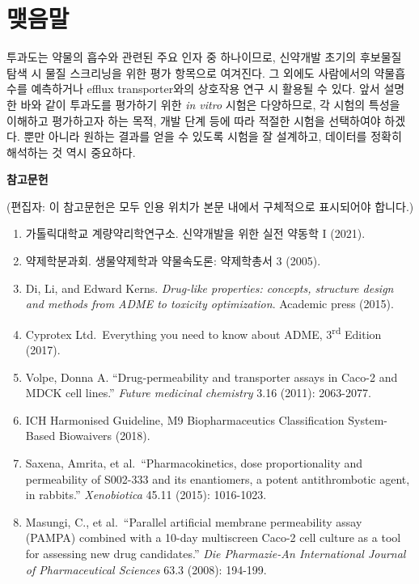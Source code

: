 \documentclass[
  11pt,
  krantz2, a4paper, twoside]{krantz}
\providecommand{\tightlist}{%
  \setlength{\itemsep}{0pt}\setlength{\parskip}{0pt}}
\begin{document}
\hypertarget{uxb9fauxc74cuxb9d0-1}{%
\section{맺음말}\label{uxb9fauxc74cuxb9d0-1}}

투과도는 약물의 흡수와 관련된 주요 인자 중 하나이므로, 신약개발 초기의
후보물질 탐색 시 물질 스크리닝을 위한 평가 항목으로 여겨진다. 그 외에도
사람에서의 약물흡수를 예측하거나 efflux transporter와의 상호작용 연구 시
활용될 수 있다. 앞서 설명한 바와 같이 투과도를 평가하기 위한 \emph{in vitro}
시험은 다양하므로, 각 시험의 특성을 이해하고 평가하고자 하는 목적, 개발
단계 등에 따라 적절한 시험을 선택하여야 하겠다. 뿐만 아니라 원하는
결과를 얻을 수 있도록 시험을 잘 설계하고, 데이터를 정확히 해석하는 것
역시 중요하다.

\textbf{참고문헌}

(편집자: 이 참고문헌은 모두 인용 위치가 본문 내에서 구체적으로
표시되어야 합니다.)

\begin{enumerate}
\def\labelenumi{\arabic{enumi}.}
\tightlist
\item
  가톨릭대학교 계량약리학연구소. 신약개발을 위한 실전 약동학 I (2021).
\item
  약제학분과회. 생물약제학과 약물속도론: 약제학총서 3 (2005).
\item
  Di, Li, and Edward Kerns. \emph{Drug-like properties: concepts, structure
  design and methods from ADME to toxicity optimization}. Academic
  press (2015).
\item
  Cyprotex Ltd.~Everything you need to know about ADME, 3\textsuperscript{rd} Edition
  (2017).
\item
  Volpe, Donna A. ``Drug-permeability and transporter assays in Caco-2
  and MDCK cell lines.'' \emph{Future medicinal chemistry} 3.16 (2011):
  2063-2077.
\item
  ICH Harmonised Guideline, M9 Biopharmaceutics Classification
  System-Based Biowaivers (2018).
\item
  Saxena, Amrita, et al.~``Pharmacokinetics, dose proportionality and
  permeability of S002-333 and its enantiomers, a potent
  antithrombotic agent, in rabbits.'' \emph{Xenobiotica} 45.11 (2015):
  1016-1023.
\item
  Masungi, C., et al.~``Parallel artificial membrane permeability assay
  (PAMPA) combined with a 10-day multiscreen Caco-2 cell culture as a
  tool for assessing new drug candidates.'' \emph{Die Pharmazie-An
  International Journal of Pharmaceutical Sciences} 63.3 (2008):
  194-199.
\end{enumerate}
\end{document}
